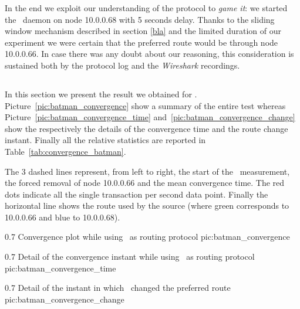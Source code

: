 In the end we exploit our understanding of the protocol to \emph{game
  it}: we started the \batman\ daemon on node 10.0.0.68 with 5 seconds
delay. Thanks to the sliding window mechanism described in section
\ref{bla} and the limited duration of our experiment we were certain
that the preferred route would be through node 10.0.0.66. In case
there was any doubt about our reasoning, this consideration is
sustained both by the protocol log and the \emph{Wireshark}
recordings.


\subsection{\batman}
In this section we present the result we obtained for
\batman. Picture~\ref{pic:batman_convergence} show a summary of the
entire test whereas Picture~\ref{pic:batman_convergence_time}
and~\ref{pic:batman_convergence_change} show the respectively the
details of the convergence time and the route change instant.
Finally all the relative statistics are reported in
Table~\ref{tab:convergence_batman}.

The 3 dashed lines represent, from left to right, the start of the
\netperf\ measurement, the forced removal of node 10.0.0.66 and the
mean convergence time. The red dots indicate all the single
transaction per second data point. Finally the horizontal line shows
the route used by the source (where green corresponds to 10.0.0.66 and
blue to 10.0.0.68).

               {0.7 \columnwidth}
               {Convergence plot while using \batman\ as routing protocol}
               {pic:batman_convergence}

               {0.7 \columnwidth}
               {Detail of the convergence instant while using \batman\ as routing protocol}
               {pic:batman_convergence_time}

               {0.7 \columnwidth}
               {Detail of the instant in which \batman\ changed the
                 preferred route}
               {pic:batman_convergence_change}

